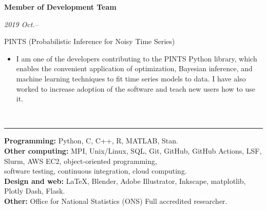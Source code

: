 \documentclass[10pt]{article}
\begin{document}
\vspace{0.2cm}







\noindent\parbox{.65\textwidth}{\raggedright  \textbf{Member of Development Team}}
\parbox{.35\textwidth}{\raggedleft \emph{2019 Oct.--}}
PINTS (Probabilistic Inference for Noisy Time Series)
\vspace{-.2cm}
\begin{itemize}
\setlength{\itemsep}{0pt}
\item I am one of the developers contributing to the PINTS Python library, which enables the convenient application of optimization, Bayesian inference, and machine learning techniques to fit time series models to data. I have also worked to increase adoption of the software and teach new users how to use it. 
\end{itemize}






\vspace{0.6cm}


\vspace{-2.75mm} \\
\rule{\textwidth}{0.4pt}
\vspace{0.1mm}
\textbf{Programming:} Python, C, C++, R, MATLAB, Stan.\\
\textbf{Other computing:} MPI, Unix/Linux, SQL, Git, GitHub, GitHub Actions, LSF, Slurm, AWS EC2, object-oriented programming,\\
software testing, continuous integration, cloud computing. \\
\textbf{Design and web:} LaTeX, Blender, Adobe Illustrator, Inkscape, matplotlib, Plotly Dash, Flask.\\
\textbf{Other:} Office for National Statistics (ONS) Full accredited researcher.

\vspace{0.6cm}


\clearpage
\end{document}
